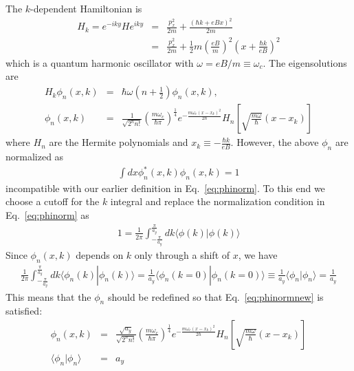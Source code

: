 The $k$-dependent Hamiltonian is
\begin{eqnarray}
H_k = e^{-iky} H e^{iky} &=& \frac{p_x^2}{2 m } + \frac{(\hbar k + eBx)^2}{2m} \\\nonumber
&=& \frac{p_x^2}{2 m } + \frac{1}{2}m \left(\frac{eB}{m}\right)^2 \left( x + \frac{\hbar k}{eB}\right)^2
\end{eqnarray}
which is a quantum harmonic oscillator with $\omega = eB/m \equiv \omega_c$. The eigensolutions are
\begin{eqnarray}
	H_k \phi_n(x,k) &=& \hbar \omega \left(n+\frac{1}{2}\right) \phi_n(x,k),\\\nonumber
	\phi_n(x,k) &=& \frac{1}{\sqrt{2^n n!}} \left( \frac{m\omega_c}{\hbar \pi} \right)^\frac{1}{4} e^{-\frac{m\omega_c(x-x_k)^2}{2\hbar}}H_n\left[\sqrt{\frac{m\omega}{\hbar}}(x-x_k)\right]
\end{eqnarray}
where $H_n$ are the Hermite polynomials and $x_k \equiv - \frac{\hbar k}{eB}$. However, the above $\phi_n$ are normalized as
\begin{eqnarray}\label{eq:llnorm}
	\int dx \phi_n^*(x,k)\phi_n(x,k) = 1
\end{eqnarray}
incompatible with our earlier definition in Eq.~\eqref{eq:phinorm}. To this end we choose a cutoff for the $k$ integral and replace the normalization condition in Eq.~\eqref{eq:phinorm} as
\begin{eqnarray}\label{eq:phinormnew}
	1 = \frac{1}{2\pi}\int_{-\frac{\pi}{a_y}}^{\frac{\pi}{a_y}}dk \langle \phi(k) | \phi(k)\rangle
\end{eqnarray}
Since $\phi_n(x,k)$ depends on $k$ only through a shift of $x$, we have
\begin{eqnarray}
	\frac{1}{2\pi}\int_{-\frac{\pi}{a_y}}^{\frac{\pi}{a_y}}dk \langle \phi_n(k) | \phi_n(k)\rangle = \frac{1}{a_y} \langle \phi_n (k=0) | \phi_n (k=0)\rangle \equiv \frac{1}{a_y} \langle \phi_n | \phi_n \rangle = \frac{1}{a_y}
\end{eqnarray}
This means that the $\phi_n$ should be redefined so that Eq.~\eqref{eq:phinormnew} is satisfied:
\begin{eqnarray}
\phi_n(x,k) &=& \frac{\sqrt{a_y}}{\sqrt{2^n n!}} \left( \frac{m\omega_c}{\hbar \pi} \right)^\frac{1}{4} e^{-\frac{m\omega_c(x-x_k)^2}{2\hbar}}H_n\left[\sqrt{\frac{m\omega}{\hbar}}(x-x_k)\right]\\\nonumber
\langle \phi_n | \phi_n \rangle &=& a_y
\end{eqnarray}

